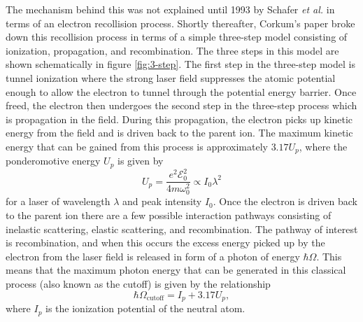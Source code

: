 The mechanism behind this was not explained until 1993 by Schafer \textit{et al.} \cite{schaferThresholdIonizationHigh1993} in terms of an electron recollision process.  Shortly thereafter, Corkum's paper \cite{corkumPlasmaPerspectiveStrong1993} broke down this recollision process in terms of a simple three-step model consisting of ionization, propagation, and recombination.  The three steps in this model are shown schematically in figure \ref{fig:3-step}.  The first step in the three-step model is tunnel ionization where the strong laser field suppresses the atomic potential enough to allow the electron to tunnel through the potential energy barrier.  Once freed, the electron then undergoes the second step in the three-step process which is propagation in the field.  During this propagation, the electron picks up kinetic energy from the field and is driven back to the parent ion.  The maximum kinetic energy that can be gained from this process is approximately $3.17 U_p$, where the ponderomotive energy $U_p$ is given by
\begin{equation}
	U_p = \frac{e^2 \mathcal{E}_0^2}{4 m \omega_0^2}\propto I_0\lambda^2
\end{equation}
for a laser of wavelength $\lambda$ and peak intensity $I_0$.  Once the electron is driven back to the parent ion there are a few possible interaction pathways consisting of inelastic scattering, elastic scattering, and recombination.  The pathway of interest is recombination, and  when this occurs the excess energy picked up by the electron from the laser field is released in form of a photon of energy $\hbar\Omega$.  This means that the maximum photon energy that can be generated in this classical process (also known as the cutoff) is given by the relationship
\begin{equation}
	\hbar\Omega_{\mathrm{cutoff}} = I_p + 3.17 U_p,
\end{equation}
where $I_p$ is the ionization potential of the neutral atom.

